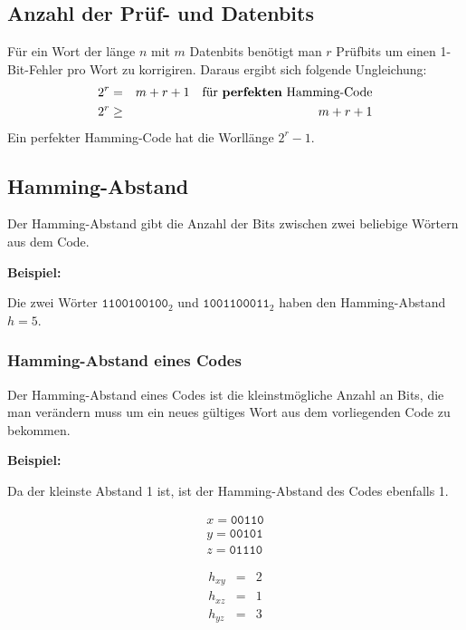 \documentclass[a4paper, landscape]{article}
\newenvironment{example}{
    \par\vspace{\abovedisplayskip}\noindent\textbf{Beispiel:}\par
}{\par\vspace{\belowdisplayskip}}
\begin{document}
\begin{multicols}{3}
        \subsection{Anzahl der Prüf- und Datenbits}
        Für ein Wort der länge $n$ mit $m$ Datenbits benötigt man $r$ Prüfbits um einen 1-Bit-Fehler pro Wort zu korrigiren.
        Daraus ergibt sich folgende Ungleichung:
        \begin{eqnarray}
            2^r &=& m + r + 1       \nonumber \quad\text{für \textbf{perfekten} Hamming-Code}  \\
            2^r &\geq& m + r + 1    \nonumber
        \end{eqnarray}
        Ein perfekter Hamming-Code hat die Worllänge $2^r-1$.
        
        \subsection{Hamming-Abstand}
        Der Hamming-Abstand gibt die Anzahl der Bits zwischen zwei beliebige Wörtern aus dem Code.
        \begin{example}
            Die zwei Wörter $\texttt{1100100100}_2$ und $\texttt{1001100011}_2$ haben den Hamming-Abstand $h = 5$.
        \end{example}
        
        \subsubsection*{Hamming-Abstand eines Codes}
        Der Hamming-Abstand eines Codes ist die kleinstmögliche Anzahl an Bits, die man verändern muss um ein neues gültiges Wort aus dem vorliegenden Code zu bekommen.
        \begin{example}
            Da der kleinste Abstand 1 ist, ist der Hamming-Abstand des Codes ebenfalls 1.
            \par\centering
            \begin{minipage}{.35\linewidth}
                \begin{align}
                    x = \texttt{00110}  \nonumber   \\
                    y = \texttt{00101}  \nonumber   \\
                    z = \texttt{01110}  \nonumber
                \end{align}
            \end{minipage}
            \begin{minipage}{.35\linewidth}
                \begin{eqnarray}
                    h_{xy} &=& 2    \nonumber   \\
                    h_{xz} &=& 1    \nonumber   \\
                    h_{yz} &=& 3    \nonumber
                \end{eqnarray}
            \end{minipage}
        \end{example}
        

\end{multicols}
\end{document}
